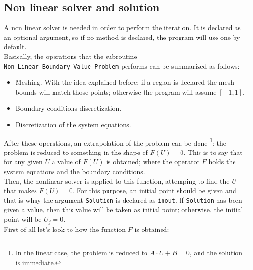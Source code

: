 \subsection{ Non linear solver and solution}

A non linear solver is needed in order to perform the iteration. It is declared
as an optional argument, so if no method is declared, the program will use one
by default. \\

Basically, the operations that the subroutine
\texttt{Non\_Linear\_Boundary\_Value\_Problem} performs can be summarized as
follows: 

\begin{itemize}
  \item Meshing. With the idea explained before: if a region is declared the
  mesh bounds will match those points; otherwise the program will assume
  $[-1,1]$.
  \item Boundary conditions discretization. 
  \item Discretization of the system equations.
\end{itemize}

After these operations, an extrapolation of the problem can be done \footnote {In the linear case,
the problem is reduced to $A\cdot U + B=0 $, and the solution is immediate.}: the
problem is reduced to something in the shape of $F(U)=0$. This is to say
that for any given $U$ a value of $F(U)$ is obtained; where the operator $F$
holds the system equations and the boundary conditions. \\

Then, the nonlinear solver is applied to this function, attemping to find the
$U$ that makes $F(U)=0$. For this purpose, an initial point should be given and
that is whay the argument \texttt{Solution} is declared as \texttt{inout}. If
\texttt{Solution} has been given a value, then this value will be taken as
initial point; otherwise, the initial point will be $U_j = 0$.  \\

First of all let's look to how the function $F$ is obtained: 

